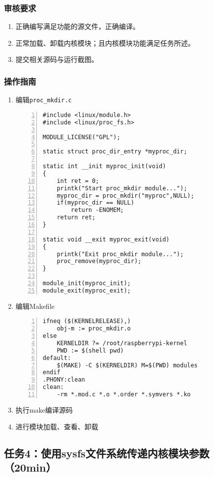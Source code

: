 \documentclass{article}
\begin{document}
\subsubsection{审核要求}
\begin{enumerate}
    \item 正确编写满足功能的源文件，正确编译。
    \item 正常加载、卸载内核模块；且内核模块功能满足任务所述。
    \item 提交相关源码与运行截图。
\end{enumerate}

\subsubsection{操作指南}
\begin{enumerate}
	\item 编辑\verb|proc_mkdir.c|
\begin{lstlisting}[numbers=left]
#include <linux/module.h>
#include <linux/proc_fs.h>

MODULE_LICENSE("GPL");

static struct proc_dir_entry *myproc_dir; 

static int __init myproc_init(void)
{
	int ret = 0;
	printk("Start proc_mkdir module...");
	myproc_dir = proc_mkdir("myproc",NULL);
	if(myproc_dir == NULL)
		return -ENOMEM;
	return ret;
}

static void __exit myproc_exit(void)
{
	printk("Exit proc_mkdir module...");
	proc_remove(myproc_dir);
}

module_init(myproc_init); 
module_exit(myproc_exit);

\end{lstlisting}
    \item 编辑Makefile
\begin{lstlisting}[numbers=left]
ifneq ($(KERNELRELEASE),)
	obj-m := proc_mkdir.o
else
	KERNELDIR ?= /root/raspberrypi-kernel
	PWD := $(shell pwd)
default:
	$(MAKE) -C $(KERNELDIR) M=$(PWD) modules
endif
.PHONY:clean
clean:
	-rm *.mod.c *.o *.order *.symvers *.ko

\end{lstlisting}
    \item 执行make编译源码
    \item 进行模块加载、查看、卸载
\end{enumerate}

\newpage
\subsection{任务4：使用sysfs文件系统传递内核模块参数（20min）}
\end{document}
